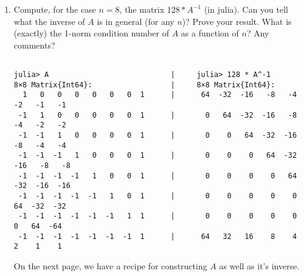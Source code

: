 \documentclass[11pt]{article}
\begin{document}
\begin{enumerate}
\begin{enumerate}
		      \item Compute, for the case \(n=8\), the matrix \(128 * A^{-1}\) (in julia).  Can you tell what the inverse of \(A\) is in general (for any \(n\))?  Prove your result.  What is (exactly) the 1-norm condition number of \(A\) as a function of \(n\)?  Any comments?
		            \begin{verbatim}
          
julia> A                            |     julia> 128 * A^-1
8×8 Matrix{Int64}:                  |     8×8 Matrix{Int64}:
  1   0   0   0   0   0   0  1      |      64  -32  -16   -8   -4   -2   -1   -1
 -1   1   0   0   0   0   0  1      |       0   64  -32  -16   -8   -4   -2   -2
 -1  -1   1   0   0   0   0  1      |       0    0   64  -32  -16   -8   -4   -4
 -1  -1  -1   1   0   0   0  1      |       0    0    0   64  -32  -16   -8   -8
 -1  -1  -1  -1   1   0   0  1      |       0    0    0    0   64  -32  -16  -16
 -1  -1  -1  -1  -1   1   0  1      |       0    0    0    0    0   64  -32  -32
 -1  -1  -1  -1  -1  -1   1  1      |       0    0    0    0    0    0   64  -64
 -1  -1  -1  -1  -1  -1  -1  1      |      64   32   16    8    4    2    1    1
        \end{verbatim}
		            On the next page, we have a recipe for constructing \(A\) as well as it's inverse.


\end{enumerate}
\end{enumerate}
\end{document}

